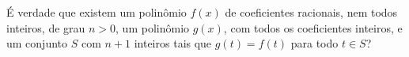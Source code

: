 É verdade que existem um polinômio $f(x)$ de coeficientes racionais, nem todos inteiros, de grau $n>0$, um polinômio $g(x)$, com todos os coeficientes inteiros, e um conjunto $S$ com $n+1$ inteiros tais que $g(t) = f(t)$ para todo $t \in S$?